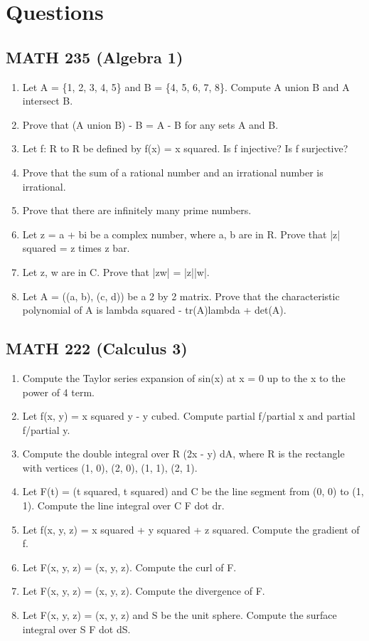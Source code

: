 \documentclass{article}
\begin{document}
\section*{Questions}

\subsection*{MATH 235 (Algebra 1)}

\begin{enumerate}
\item Let A = \{1, 2, 3, 4, 5\} and B = \{4, 5, 6, 7, 8\}. Compute A union B and A intersect B.
\item Prove that (A union B) - B = A - B for any sets A and B.
\item Let f: R to R be defined by f(x) = x squared. Is f injective? Is f surjective?
\item Prove that the sum of a rational number and an irrational number is irrational.
\item Prove that there are infinitely many prime numbers.
\item Let z = a + bi be a complex number, where a, b are in R. Prove that |z| squared = z times z bar.
\item Let z, w are in C. Prove that |zw| = |z||w|.
\item Let A = ((a, b), (c, d)) be a 2 by 2 matrix. Prove that the characteristic polynomial of A is lambda squared - tr(A)lambda + det(A).
\end{enumerate}

\subsection*{MATH 222 (Calculus 3)}

\begin{enumerate}
\item Compute the Taylor series expansion of sin(x) at x = 0 up to the x to the power of 4 term.
\item Let f(x, y) = x squared y - y cubed. Compute partial f/partial x and partial f/partial y.
\item Compute the double integral over R (2x - y) dA, where R is the rectangle with vertices (1, 0), (2, 0), (1, 1), (2, 1).
\item Let F(t) = (t squared, t squared) and C be the line segment from (0, 0) to (1, 1). Compute the line integral over C F dot dr.
\item Let f(x, y, z) = x squared + y squared + z squared. Compute the gradient of f.
\item Let F(x, y, z) = (x, y, z). Compute the curl of F.
\item Let F(x, y, z) = (x, y, z). Compute the divergence of F.
\item Let F(x, y, z) = (x, y, z) and S be the unit sphere. Compute the surface integral over S F dot dS.
\end{enumerate}
\end{document}
